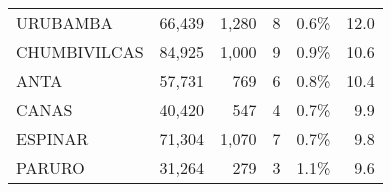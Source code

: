 \begin{tabular}{lrrrrr}
	\cellcolor[HTML]{FFCE93}URUBAMBA      & 66,439                                                         & 1,280                                                                           & 8                                                              & 0.6\%                                                                  & 12.0                                                                                                                               \\
	\cellcolor[HTML]{FFFC9E}CHUMBIVILCAS  & 84,925                                                         & 1,000                                                                           & 9                                                              & 0.9\%                                                                  & 10.6                                                                                                                               \\
	\cellcolor[HTML]{FFFC9E}ANTA          & 57,731                                                         & 769                                                                             & 6                                                              & 0.8\%                                                                  & 10.4                                                                                                                               \\
	\cellcolor[HTML]{FFFC9E}CANAS         & 40,420                                                         & 547                                                                             & 4                                                              & 0.7\%                                                                  & 9.9                                                                                                                                \\
	\cellcolor[HTML]{FFFC9E}ESPINAR       & 71,304                                                         & 1,070                                                                           & 7                                                              & 0.7\%                                                                  & 9.8                                                                                                                                \\
	\cellcolor[HTML]{FFFC9E}PARURO        & 31,264                                                         & 279                                                                             & 3                                                              & 1.1\%                                                                  & 9.6                                                                                                                                \\

\end{tabular}
